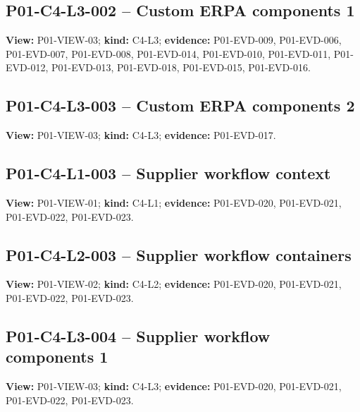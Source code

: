 \documentclass[10pt,letterpaper]{article}
\begin{document}
\subsection{P01-C4-L3-002 -- Custom ERPA components 1}
\textbf{View:} P01-VIEW-03; \textbf{kind:} C4-L3; \textbf{evidence:} P01-EVD-009, P01-EVD-006, P01-EVD-007, P01-EVD-008, P01-EVD-014, P01-EVD-010, P01-EVD-011, P01-EVD-012, P01-EVD-013, P01-EVD-018, P01-EVD-015, P01-EVD-016.\par
{}
\clearpage

\subsection{P01-C4-L3-003 -- Custom ERPA components 2}
\textbf{View:} P01-VIEW-03; \textbf{kind:} C4-L3; \textbf{evidence:} P01-EVD-017.\par
{}
\clearpage

\subsection{P01-C4-L1-003 -- Supplier workflow context}
\textbf{View:} P01-VIEW-01; \textbf{kind:} C4-L1; \textbf{evidence:} P01-EVD-020, P01-EVD-021, P01-EVD-022, P01-EVD-023.\par
{}
\clearpage

\subsection{P01-C4-L2-003 -- Supplier workflow containers}
\textbf{View:} P01-VIEW-02; \textbf{kind:} C4-L2; \textbf{evidence:} P01-EVD-020, P01-EVD-021, P01-EVD-022, P01-EVD-023.\par
{}
\clearpage

\subsection{P01-C4-L3-004 -- Supplier workflow components 1}
\textbf{View:} P01-VIEW-03; \textbf{kind:} C4-L3; \textbf{evidence:} P01-EVD-020, P01-EVD-021, P01-EVD-022, P01-EVD-023.\par
{}
\clearpage
\end{document}
